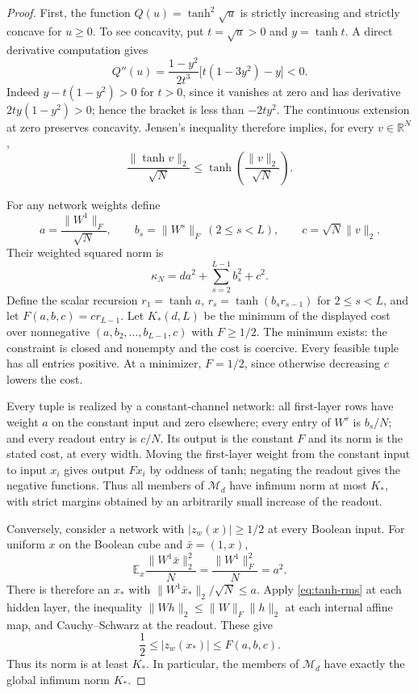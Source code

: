 \begin{proof}
First, the function $Q(u)=\tanh^2\sqrt u$ is strictly increasing and strictly
concave for $u\ge0$. To see concavity, put $t=\sqrt u>0$ and $y=\tanh t$.
A direct derivative computation gives
\[
 Q''(u)=\frac{1-y^2}{2t^3}\bigl[t(1-3y^2)-y\bigr]<0.
\]
Indeed $y-t(1-y^2)>0$ for $t>0$, since it vanishes at zero and has derivative
$2ty(1-y^2)>0$; hence the bracket is less than $-2ty^2$.
The continuous extension at zero preserves concavity.
Jensen's inequality therefore implies, for every $v\in\mathbb R^N$,
\begin{equation}\label{eq:tanh-rms}
 \frac{\|\tanh v\|_2}{\sqrt N}
 \le\tanh\!\left(\frac{\|v\|_2}{\sqrt N}\right).
\end{equation}

For any network weights define
\[
 a=\frac{\|W^1\|_F}{\sqrt N},\qquad
 b_s=\|W^s\|_F\ (2\le s<L),\qquad
 c=\sqrt N\|v\|_2.
\]
Their weighted squared norm is
\[
 \kappa_N=d a^2+\sum_{s=2}^{L-1}b_s^2+c^2.
\]
Define the scalar recursion $r_1=\tanh a$, $r_s=\tanh(b_s r_{s-1})$ for
$2\le s<L$, and let $F(a,b,c)=c r_{L-1}$.
Let $K_*(d,L)$ be the minimum of the displayed cost over nonnegative
$(a,b_2,\ldots,b_{L-1},c)$ with $F\ge1/2$.
The minimum exists: the constraint is closed and nonempty and the cost is
coercive. Every feasible tuple has all entries positive. At a minimizer,
$F=1/2$, since otherwise decreasing $c$ lowers the cost.

Every tuple is realized by a constant-channel network: all first-layer rows
have weight $a$ on the constant input and zero elsewhere; every entry of
$W^s$ is $b_s/N$; and every readout entry is $c/N$.
Its output is the constant $F$ and its norm is the stated cost, at every width.
Moving the first-layer weight from the constant input to input $x_i$ gives
output $F x_i$ by oddness of tanh; negating the readout gives the negative
functions. Thus all members of $\mathcal M_d$ have infimum norm at most $K_*$,
with strict margins obtained by an arbitrarily small increase of the readout.

Conversely, consider a network with $|z_w(x)|\ge1/2$ at every Boolean input.
For uniform $x$ on the Boolean cube and $\bar x=(1,x)$,
\[
 \mathbb E_x\frac{\|W^1\bar x\|_2^2}{N}
 =\frac{\|W^1\|_F^2}{N}=a^2.
\]
There is therefore an $x_*$ with
$\|W^1\bar x_*\|_2/\sqrt N\le a$.
Apply \eqref{eq:tanh-rms} at each hidden layer, the inequality
$\|Wh\|_2\le\|W\|_F\|h\|_2$ at each internal affine map, and Cauchy--Schwarz
at the readout. These give
\[
 \frac12\le|z_w(x_*)|\le F(a,b,c).
\]
Thus its norm is at least $K_*$. In particular, the members of
$\mathcal M_d$ have exactly the global infimum norm $K_*$.


\end{proof}
